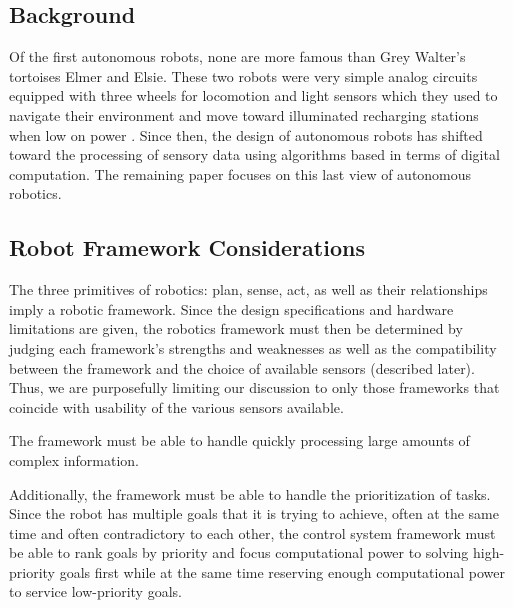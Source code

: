 









\subsection*{Background}
Of the first autonomous robots, none are more famous than Grey Walter's tortoises Elmer and Elsie. These two robots were very simple analog circuits equipped with three wheels for locomotion and light sensors which they used to navigate their environment and move toward illuminated recharging stations when low on power \cite{Walter:1950}. Since then, the design of autonomous robots has shifted toward the processing of sensory data using algorithms based in terms of digital computation. The remaining paper focuses on this last view of autonomous robotics.

\subsection*{Robot Framework Considerations}
The three primitives of robotics: plan, sense, act, as well as their relationships imply a robotic framework. Since the design specifications and hardware limitations are given, the robotics framework must then be determined by judging each framework's strengths and weaknesses as well as the compatibility between the framework and the choice of available sensors (described later). Thus, we are purposefully limiting our discussion to only those frameworks that coincide with usability of the various sensors available.

The framework must be able to handle quickly processing large amounts of complex information.

Additionally, the framework must be able to handle the prioritization of tasks. Since the robot has multiple goals that it is trying to achieve, often at the same time and often contradictory to each other, the control system framework must be able to rank goals by priority and focus computational power to solving high-priority goals first while at the same time reserving enough computational power to service low-priority goals.

